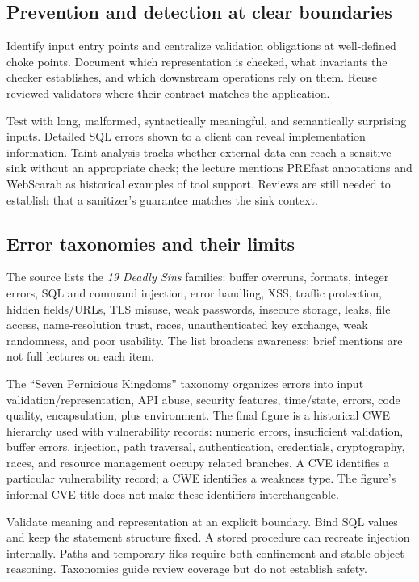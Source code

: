 \documentclass[11pt,a4paper]{article}
\numberwithin{figure}{section}
\begin{document}
\subsection{Prevention and detection at clear boundaries}
Identify input entry points and centralize validation obligations at well-defined choke points. Document which representation is checked, what invariants the checker establishes, and which downstream operations rely on them. Reuse reviewed validators where their contract matches the application.

Test with long, malformed, syntactically meaningful, and semantically surprising inputs. Detailed SQL errors shown to a client can reveal implementation information. Taint analysis tracks whether external data can reach a sensitive sink without an appropriate check; the lecture mentions PREfast annotations and WebScarab as historical examples of tool support. Reviews are still needed to establish that a sanitizer's guarantee matches the sink context.

\subsection{Error taxonomies and their limits}
The source lists the \emph{19 Deadly Sins} families: buffer overruns, formats, integer errors, SQL and command injection, error handling, XSS, traffic protection, hidden fields/URLs, TLS misuse, weak passwords, insecure storage, leaks, file access, name-resolution trust, races, unauthenticated key exchange, weak randomness, and poor usability. The list broadens awareness; brief mentions are not full lectures on each item.

The ``Seven Pernicious Kingdoms'' taxonomy organizes errors into input validation/representation, API abuse, security features, time/state, errors, code quality, encapsulation, plus environment. The final figure is a historical CWE hierarchy used with vulnerability records: numeric errors, insufficient validation, buffer errors, injection, path traversal, authentication, credentials, cryptography, races, and resource management occupy related branches. A CVE identifies a particular vulnerability record; a CWE identifies a weakness type. The figure's informal CVE title does not make these identifiers interchangeable.

\begin{takeaway}
Validate meaning and representation at an explicit boundary. Bind SQL values and keep the statement structure fixed. A stored procedure can recreate injection internally. Paths and temporary files require both confinement and stable-object reasoning. Taxonomies guide review coverage but do not establish safety.
\end{takeaway}
\end{document}
